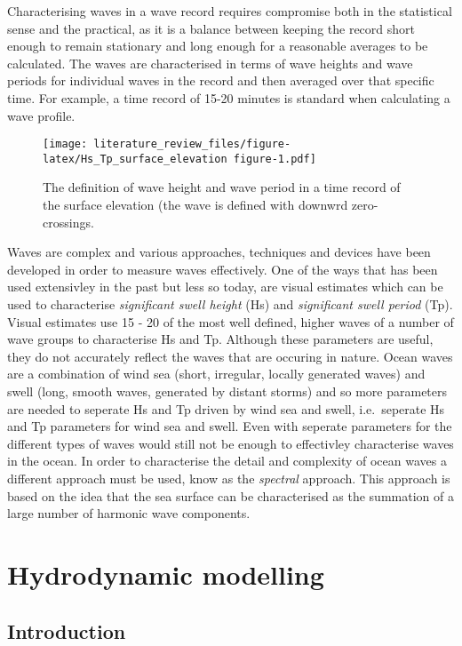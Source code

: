 \documentclass[]{article}
\begin{document}
Characterising waves in a wave record requires compromise both in the
statistical sense and the practical, as it is a balance between keeping
the record short enough to remain stationary and long enough for a
reasonable averages to be calculated. The waves are characterised in
terms of wave heights and wave periods for individual waves in the
record and then averaged over that specific time. For example, a time
record of 15-20 minutes is standard when calculating a wave profile.

\begin{figure}
\centering
\texttt{[image: literature\_review\_files/figure-latex/Hs\_Tp\_surface\_elevation figure-1.pdf]}
\caption{The definition of wave height and wave period in a time record
of the surface elevation (the wave is defined with downwrd
zero-crossings.}
\end{figure}

Waves are complex and various approaches, techniques and devices have
been developed in order to measure waves effectively. One of the ways
that has been used extensivley in the past but less so today, are visual
estimates which can be used to characterise \emph{significant swell
height} (Hs) and \emph{significant swell period} (Tp). Visual estimates
use 15 - 20 of the most well defined, higher waves of a number of wave
groups to characterise Hs and Tp. Although these parameters are useful,
they do not accurately reflect the waves that are occuring in nature.
Ocean waves are a combination of wind sea (short, irregular, locally
generated waves) and swell (long, smooth waves, generated by distant
storms) and so more parameters are needed to seperate Hs and Tp driven
by wind sea and swell, i.e.~seperate Hs and Tp parameters for wind sea
and swell. Even with seperate parameters for the different types of
waves would still not be enough to effectivley characterise waves in the
ocean. In order to characterise the detail and complexity of ocean waves
a different approach must be used, know as the \emph{spectral} approach.
This approach is based on the idea that the sea surface can be
characterised as the summation of a large number of harmonic wave
components.

\hypertarget{hydrodynamic-modelling}{%
\section{Hydrodynamic modelling}\label{hydrodynamic-modelling}}

\hypertarget{introduction-1}{%
\subsection{Introduction}\label{introduction-1}}
\end{document}
